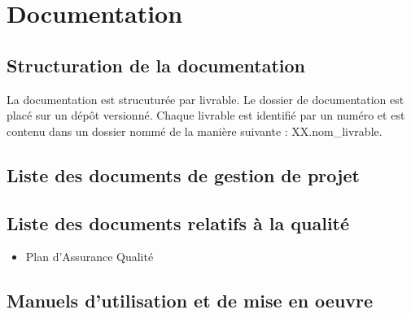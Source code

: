 \section{Documentation}

\subsection{Structuration de la documentation}
La documentation est strucuturée par livrable. Le dossier de documentation est placé sur un dépôt versionné.
Chaque livrable est identifié par un numéro et est contenu dans un dossier nommé de la manière suivante : XX.nom_livrable.


\subsection{Liste des documents de gestion de projet}


\subsection{Liste des documents relatifs à la qualité}

\begin{itemize}
    \item Plan d'Assurance Qualité
\end{itemize}

\subsection{Manuels d'utilisation et de mise en oeuvre}
\pagebreak
